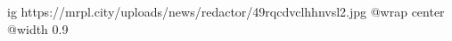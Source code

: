  
 
 
 
 

\ifcmt
  ig https://mrpl.city/uploads/news/redactor/49rqcdvclhhnvsl2.jpg
  @wrap center
  @width 0.9
\fi
